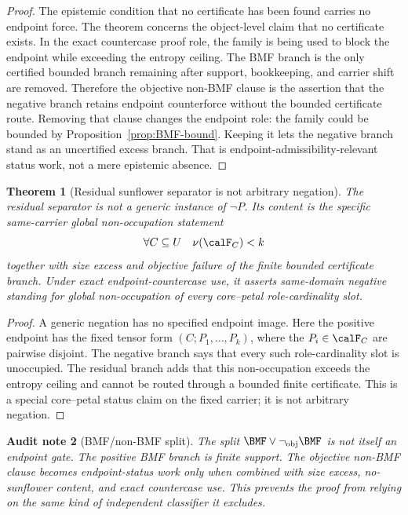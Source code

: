 \documentclass[11pt]{article}
\newtheorem{theorem}{Theorem}[section]
\newtheorem{audit}[theorem]{Audit note}
\begin{document}
\begin{proof}
The epistemic condition that no certificate has been found carries no endpoint force.  The theorem concerns the object-level claim that no certificate exists.  In the exact countercase proof role, the family is being used to block the endpoint while exceeding the entropy ceiling.  The BMF branch is the only certified bounded branch remaining after support, bookkeeping, and carrier shift are removed.  Therefore the objective non-BMF clause is the assertion that the negative branch retains endpoint counterforce without the bounded certificate route.  Removing that clause changes the endpoint role: the family could be bounded by Proposition~\ref{prop:BMF-bound}.  Keeping it lets the negative branch stand as an uncertified excess branch.  That is endpoint-admissibility-relevant status work, not a mere epistemic absence.
\end{proof}

\begin{theorem}[Residual sunflower separator is not arbitrary negation]\label{thm:not-arbitrary-negation}
The residual separator is not a generic instance of \(\neg P\).  Its content is the specific same-carrier global non-occupation statement
\[
  \forall C\subseteq U\quad \nu(\calF_C)<k
\]
together with size excess and objective failure of the finite bounded certificate branch.  Under exact endpoint-countercase use, it asserts same-domain negative standing for global non-occupation of every core--petal role-cardinality slot.
\end{theorem}

\begin{proof}
A generic negation has no specified endpoint image.  Here the positive endpoint has the fixed tensor form \((C;P_1,\dots,P_k)\), where the \(P_i\in\calF_C\) are pairwise disjoint.  The negative branch says that every such role-cardinality slot is unoccupied.  The residual branch adds that this non-occupation exceeds the entropy ceiling and cannot be routed through a bounded finite certificate.  This is a special core--petal status claim on the fixed carrier; it is not arbitrary negation.
\end{proof}

\begin{audit}[BMF/non-BMF split]
The split \(\BMF\vee\neg_{\mathrm{obj}}\BMF\) is not itself an endpoint gate.  The positive BMF branch is finite support.  The objective non-BMF clause becomes endpoint-status work only when combined with size excess, no-sunflower content, and exact countercase use.  This prevents the proof from relying on the same kind of independent classifier it excludes.
\end{audit}
\end{document}
